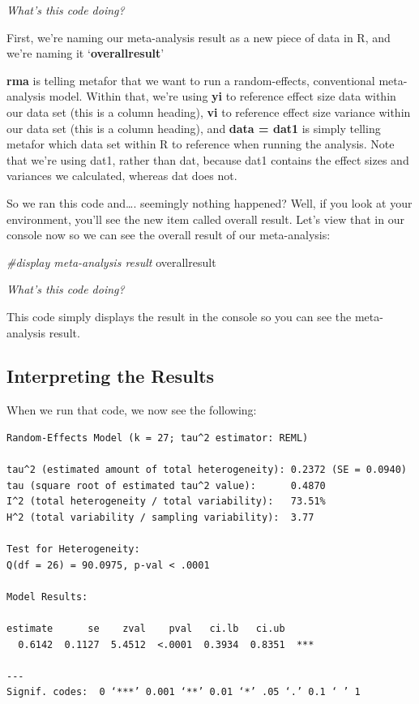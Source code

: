 \documentclass[
]{book}
\newenvironment{Shaded}{\begin{snugshade}}{\end{snugshade}}
\newcommand{\CommentTok}[1]{\textcolor[rgb]{0.56,0.35,0.01}{\textit{#1}}}
\newcommand{\NormalTok}[1]{#1}
\begin{document}
\emph{What's this code doing?}

First, we're naming our meta-analysis result as a new piece of data in R, and we're naming it `\textbf{overallresult}'

\textbf{rma} is telling metafor that we want to run a random-effects, conventional meta-analysis model. Within that, we're using \textbf{yi} to reference effect size data within our data set (this is a column heading), \textbf{vi} to reference effect size variance within our data set (this is a column heading), and \textbf{data = dat1} is simply telling metafor which data set within R to reference when running the analysis. Note that we're using dat1, rather than dat, because dat1 contains the effect sizes and variances we calculated, whereas dat does not.

So we ran this code and\ldots. seemingly nothing happened? Well, if you look at your environment, you'll see the new item called overall result. Let's view that in our console now so we can see the overall result of our meta-analysis:

\begin{Shaded}
\begin{Highlighting}[]
\CommentTok{\#display meta{-}analysis result}
\NormalTok{overallresult}
\end{Highlighting}
\end{Shaded}

\emph{What's this code doing?}

This code simply displays the result in the console so you can see the meta-analysis result.

\hypertarget{interpreting-the-results}{%
\subsection{Interpreting the Results}\label{interpreting-the-results}}

When we run that code, we now see the following:

\begin{verbatim}
Random-Effects Model (k = 27; tau^2 estimator: REML)

tau^2 (estimated amount of total heterogeneity): 0.2372 (SE = 0.0940)
tau (square root of estimated tau^2 value):      0.4870
I^2 (total heterogeneity / total variability):   73.51%
H^2 (total variability / sampling variability):  3.77

Test for Heterogeneity:
Q(df = 26) = 90.0975, p-val < .0001

Model Results:

estimate      se    zval    pval   ci.lb   ci.ub      
  0.6142  0.1127  5.4512  <.0001  0.3934  0.8351  *** 

---
Signif. codes:  0 ‘***’ 0.001 ‘**’ 0.01 ‘*’ .05 ‘.’ 0.1 ‘ ’ 1
\end{verbatim}
\end{document}
